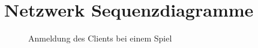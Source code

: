 \section{Netzwerk Sequenzdiagramme}

\begin{figure}[H]
  \begin{center}
  \end{center}
  \caption{Anmeldung des Clients bei einem Spiel}
\end{figure}

